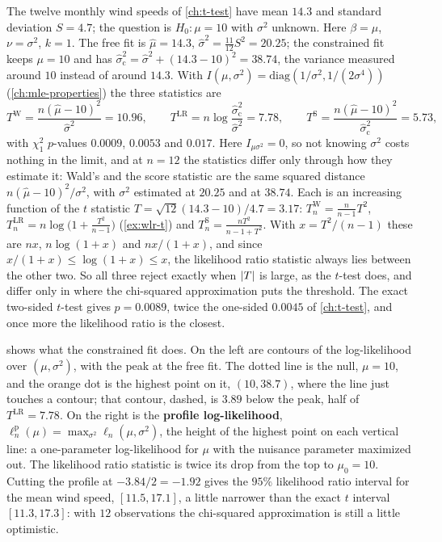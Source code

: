 \begin{worked}
The twelve monthly wind speeds of \cref{ch:t-test} have mean $14.3$ and standard deviation $S = 4.7$; the question is $H_0: \mu = 10$ with $\sigma^2$ unknown.
Here $\beta = \mu$, $\nu = \sigma^2$, $k = 1$.
The free fit is $\hat{\mu} = 14.3$, $\hat{\sigma}^2 = \frac{11}{12}S^2 = 20.25$; the constrained fit keeps $\mu = 10$ and has $\hat{\sigma}^2_{\mathrm{c}} = \hat{\sigma}^2 + (14.3 - 10)^2 = 38.74$, the variance measured around $10$ instead of around $14.3$.
With $I(\mu, \sigma^2) = \mathrm{diag}(1/\sigma^2, 1/(2\sigma^4))$ (\cref{ch:mle-properties}) the three statistics are
\[
T^{\mathrm{W}} = \frac{n(\hat{\mu} - 10)^2}{\hat{\sigma}^2} = 10.96, \qquad T^{\mathrm{LR}} = n\log\frac{\hat{\sigma}^2_{\mathrm{c}}}{\hat{\sigma}^2} = 7.78, \qquad T^{\mathrm{S}} = \frac{n(\hat{\mu} - 10)^2}{\hat{\sigma}^2_{\mathrm{c}}} = 5.73,
\]
with $\chi^2_1$ $p$-values $0.0009$, $0.0053$ and $0.017$.
Here $I_{\mu\sigma^2} = 0$, so not knowing $\sigma^2$ costs nothing in the limit, and at $n = 12$ the statistics differ only through how they estimate it: Wald's and the score statistic are the same squared distance $n(\hat{\mu} - 10)^2/\sigma^2$, with $\sigma^2$ estimated at $20.25$ and at $38.74$.
Each is an increasing function of the $t$ statistic $T = \sqrt{12}(14.3 - 10)/4.7 = 3.17$: $T^{\mathrm{W}}_n = \frac{n}{n-1}T^2$, $T^{\mathrm{LR}}_n = n\log\big(1 + \frac{T^2}{n-1}\big)$ (\cref{ex:wlr-t}) and $T^{\mathrm{S}}_n = \frac{nT^2}{n - 1 + T^2}$.
With $x = T^2/(n - 1)$ these are $nx$, $n\log(1 + x)$ and $nx/(1 + x)$, and since $x/(1 + x) \leq \log(1 + x) \leq x$, the likelihood ratio statistic always lies between the other two.
So all three reject exactly when $\lvert T\rvert$ is large, as the $t$-test does, and differ only in where the chi-squared approximation puts the threshold. The exact two-sided $t$-test gives $p = 0.0089$, twice the one-sided $0.0045$ of \cref{ch:t-test}, and once more the likelihood ratio is the closest.
\end{worked}

 shows what the constrained fit does.
On the left are contours of the log-likelihood over $(\mu, \sigma^2)$, with the peak at the free fit.
The dotted line is the null, $\mu = 10$, and the orange dot is the highest point on it, $(10, 38.7)$, where the line just touches a contour; that contour, dashed, is $3.89$ below the peak, half of $T^{\mathrm{LR}} = 7.78$.
On the right is the \textbf{profile log-likelihood}, $\ell_n^{\mathrm{p}}(\mu) = \max_{\sigma^2}\ell_n(\mu, \sigma^2)$, the height of the highest point on each vertical line: a one-parameter log-likelihood for $\mu$ with the nuisance parameter maximized out.
The likelihood ratio statistic is twice its drop from the top to $\mu_0 = 10$.
Cutting the profile at $-3.84/2 = -1.92$ gives the $95\%$ likelihood ratio interval for the mean wind speed, $[11.5, 17.1]$, a little narrower than the exact $t$ interval $[11.3, 17.3]$: with $12$ observations the chi-squared approximation is still a little optimistic.

